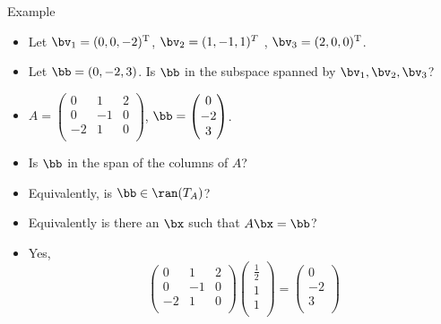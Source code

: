 \documentclass{beamer}
\begin{document}
\begin{frame}{Example}

\begin{itemize}
\item Let $\bv_1 = (0, 0, -2)^{\text{T}}$, $\bv_2 = (1, -1, 1)^{T}$ , $\bv_3=(2,0,0)^{\text{T}}$.
\item Let $\bb = (0,-2,3)$. Is $\bb$ in the subspace spanned by $\bv_1,\bv_2,\bv_3$?
\item
$A=
\begin{pmatrix}
 0 & 1 &  2 \\
 0 & -1 & 0 \\
-2 &  1 &  0 \\
\end{pmatrix}
$,
$\bb=
\begin{pmatrix}
 0 \\
-2 \\
 3 \\
\end{pmatrix}
$.
\item Is $\bb$ in the span of the columns of $A$?
\item Equivalently, is $\bb\in\ran(T_A)$?
\item Equivalently is there an $\bx$ such that $A\bx=\bb$?
\item Yes,
$$
\begin{pmatrix}
 0 &  1 &  2 \\
 0 & -1 &  0 \\
-2 &  1 &  0 \\
\end{pmatrix}
\begin{pmatrix}
 \frac{1}{2} \\
 1           \\
 1           \\
\end{pmatrix}
=
\begin{pmatrix}
0 \\
-2 \\
 3 \\
\end{pmatrix}
$$
\end{itemize}

\end{frame}
\end{document}
